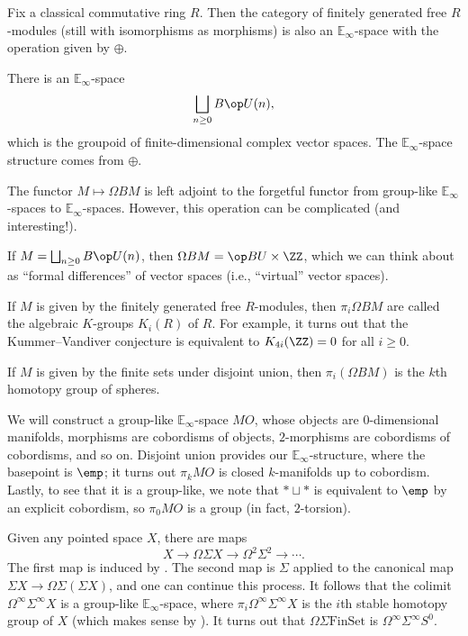 \documentclass[../notes.tex]{subfiles}
\begin{document}
\begin{example}
	Fix a classical commutative ring $R$. Then the category of finitely generated free $R$-mod\-ules (still with isomorphisms as morphisms) is also an $\mathbb E_\infty$-space with the operation given by $\oplus$.
\end{example}
\begin{example}
	There is an $\mathbb E_\infty$-space
	\[\bigsqcup_{n\ge0}B\op U(n),\]
	which is the groupoid of finite-dimensional complex vector spaces. The $\mathbb E_\infty$-space structure comes from $\oplus$.
\end{example}
\begin{remark}
	The functor $M\mapsto\Omega BM$ is left adjoint to the forgetful functor from group-like $\mathbb E_\infty$-spaces to $\mathbb E_\infty$-spaces. However, this operation can be complicated (and interesting!).
\end{remark}
\begin{example}
	If $M=\bigsqcup_{n\ge0}B\op U(n)$, then $\Omega BM=\op BU\times\ZZ$, which we can think about as ``formal differences'' of vector spaces (i.e., ``virtual'' vector spaces).
\end{example}
\begin{example}
	If $M$ is given by the finitely generated free $R$-modules, then $\pi_i\Omega BM$ are called the algebraic $K$-groups $K_i(R)$ of $R$. For example, it turns out that the Kummer--Vandiver conjecture is equivalent to $K_{4i}(\ZZ)=0$ for all $i\ge0$.
\end{example}
\begin{example}
	If $M$ is given by the finite sets under disjoint union, then $\pi_i(\Omega BM)$ is the $k$th homotopy group of spheres.
\end{example}
\begin{example}
	We will construct a group-like $\mathbb E_\infty$-space $MO$, whose objects are $0$-dimensional manifolds, morphisms are cobordisms of objects, $2$-morphisms are cobordisms of cobordisms, and so on. Disjoint union provides our $\mathbb E_\infty$-structure, where the basepoint is $\emp$; it turns out $\pi_kMO$ is closed $k$-manifolds up to cobordism. Lastly, to see that it is a group-like, we note that $*\sqcup*$ is equivalent to $\emp$ by an explicit cobordism, so $\pi_0MO$ is a group (in fact, $2$-torsion).
\end{example}
\begin{example} \label{ex:space-to-e-inf}
	Given any pointed space $X$, there are maps
	\[X\to\Omega\Sigma X\to\Omega^2\Sigma^2\to\cdots.\]
	The first map is induced by . The second map is $\Sigma$ applied to the canonical map $\Sigma X\to\Omega\Sigma(\Sigma X)$, and one can continue this process. It follows that the colimit $\Omega^\infty\Sigma^\infty X$ is a group-like $\mathbb E_\infty$-space, where $\pi_i\Omega^\infty\Sigma^\infty X$ is the $i$th stable homotopy group of $X$ (which makes sense by ). It turns out that $\Omega\Sigma\mathrm{FinSet}$ is $\Omega^\infty\Sigma^\infty S^0$.
\end{example}
\end{document}
